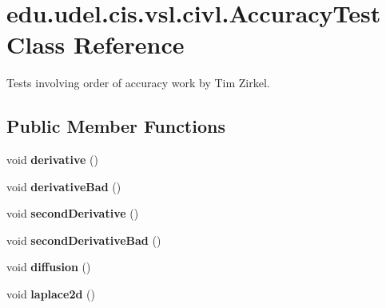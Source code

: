 \hypertarget{classedu_1_1udel_1_1cis_1_1vsl_1_1civl_1_1AccuracyTest}{}\section{edu.\+udel.\+cis.\+vsl.\+civl.\+Accuracy\+Test Class Reference}
\label{classedu_1_1udel_1_1cis_1_1vsl_1_1civl_1_1AccuracyTest}


Tests involving order of accuracy work by Tim Zirkel.  


\subsection*{Public Member Functions}
\begin{DoxyCompactItemize}
\item 
\hypertarget{classedu_1_1udel_1_1cis_1_1vsl_1_1civl_1_1AccuracyTest_a4c99f2e2043e22ddd90ac3b6ca17696a}{}void {\bfseries derivative} ()\label{classedu_1_1udel_1_1cis_1_1vsl_1_1civl_1_1AccuracyTest_a4c99f2e2043e22ddd90ac3b6ca17696a}

\item 
\hypertarget{classedu_1_1udel_1_1cis_1_1vsl_1_1civl_1_1AccuracyTest_a86e5ac367d9704037ce1b6d799523a4f}{}void {\bfseries derivative\+Bad} ()\label{classedu_1_1udel_1_1cis_1_1vsl_1_1civl_1_1AccuracyTest_a86e5ac367d9704037ce1b6d799523a4f}

\item 
\hypertarget{classedu_1_1udel_1_1cis_1_1vsl_1_1civl_1_1AccuracyTest_aac62144a7c302f569468c0cc4d36f31f}{}void {\bfseries second\+Derivative} ()\label{classedu_1_1udel_1_1cis_1_1vsl_1_1civl_1_1AccuracyTest_aac62144a7c302f569468c0cc4d36f31f}

\item 
\hypertarget{classedu_1_1udel_1_1cis_1_1vsl_1_1civl_1_1AccuracyTest_a16b564b77a2a91045fbe4b7ec1b1780a}{}void {\bfseries second\+Derivative\+Bad} ()\label{classedu_1_1udel_1_1cis_1_1vsl_1_1civl_1_1AccuracyTest_a16b564b77a2a91045fbe4b7ec1b1780a}

\item 
\hypertarget{classedu_1_1udel_1_1cis_1_1vsl_1_1civl_1_1AccuracyTest_a834df77685c5d3c05709c04d7b80fa2a}{}void {\bfseries diffusion} ()\label{classedu_1_1udel_1_1cis_1_1vsl_1_1civl_1_1AccuracyTest_a834df77685c5d3c05709c04d7b80fa2a}

\item 
\hypertarget{classedu_1_1udel_1_1cis_1_1vsl_1_1civl_1_1AccuracyTest_a3416160e3f1616e7250ddfb739319f98}{}void {\bfseries laplace2d} ()\label{classedu_1_1udel_1_1cis_1_1vsl_1_1civl_1_1AccuracyTest_a3416160e3f1616e7250ddfb739319f98}


\end{DoxyCompactItemize}

